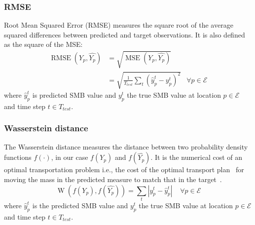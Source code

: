 \documentclass[a4paper,11pt,oneside]{report}
\begin{document}
\subsubsection{RMSE}\label{subsubsec:rmse}
Root Mean Squared Error (RMSE) measures the square root of the average squared differences between predicted and target observations. It is also defined as the square of the MSE:
\begin{align}\label{eq:RMSE}
        \operatorname{RMSE}\left(Y_{p},\widehat{Y_{p}}\right) & = \sqrt{\operatorname{MSE}\left(Y_{p},\widehat{Y_{p}}\right)} \\ & = \sqrt{\frac{1}{T_{test}}\sum_{t}(\hat{y}_{p}^{t}-y^{t}_{p})^2} & \forall p \in \mathcal{E} 
\end{align}
where $\hat{y}_{p}^{t}$ is predicted SMB value and $y^{t}_{p}$ the true SMB value at location $p\in \mathcal{E} $ and time step $t\in T_{test}$. 

\subsubsection{Wasserstein distance}\label{subsubsec:wasserstein}
The Wasserstein distance measures the distance between two probability density functions $f(\cdotp)$, in our case $f(Y_p)$ and $f(\widehat{Y_p})$. It is the numerical cost of an optimal transportation problem i.e., the cost of the optimal transport plan~\cite{villani} for moving the mass in the predicted
measure to match that in the target~\cite{wasserstein1}. 
\begin{equation}
    \operatorname{W}\left(f(Y_p),f(\widehat{Y_p})\right) = \sum_{t}|y^{t}_{p}-\hat{y}_{p}^{t}| \;\;\;\; \forall p \in \mathcal{E}
\end{equation}
where $\hat{y}_{p}^{t}$ is the predicted SMB value and $y^{t}_{p}$ the true SMB value at location $p\in \mathcal{E} $ and time step $t\in T_{test}$. 
\end{document}
